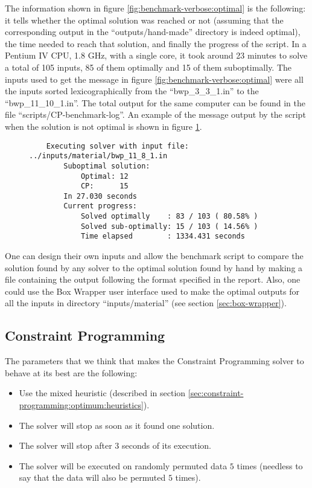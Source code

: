 The information shown in figure \ref{fig:benchmark-verbose:optimal} is the following:
it tells whether the optimal solution was reached or not (assuming that the
corresponding output in the ``outputs/hand-made'' directory is indeed optimal),
the time needed to reach that solution, and finally the progress of the script.
In a Pentium IV CPU, 1.8 GHz, with a single core, it took around 23 minutes to
solve a total of 105 inputs, 85 of them optimally and 15 of them suboptimally.
The inputs used to get the message in figure \ref{fig:benchmark-verbose:optimal} were
all the inputs sorted lexicographically from the ``bwp\_3\_3\_1.in'' to the
``bwp\_11\_10\_1.in''. The total output for the same computer can be found
in the file ``scripts/CP-benchmark-log''. An example of the message output by
the script when the solution is not optimal is shown in figure
\ref{fig:benchmark-verbose:suboptimal}.

\begin{figure}[H]
\centering
\begin{verbatim}
	Executing solver with input file: ../inputs/material/bwp_11_8_1.in
		Suboptimal solution:
			Optimal: 12
			CP:      15
		In 27.030 seconds
		Current progress:
			Solved optimally    : 83 / 103 ( 80.58% )
			Solved sub-optimally: 15 / 103 ( 14.56% )
			Time elapsed        : 1334.431 seconds
\end{verbatim}
\label{fig:benchmark-verbose:suboptimal}
\end{figure}

\hfill

One can design their own inputs and allow the benchmark script to compare
the solution found by any solver to the optimal solution found by hand by
making a file containing the output following the format specified in the
report. Also, one could use the Box Wrapper user interface used to make the
optimal outputs for all the inputs in directory ``inputs/material'' (see
section \ref{sec:box-wrapper}).

\subsection{Constraint Programming}
\label{sec:benchmarking:constraint-programming}

The parameters that we think that makes the Constraint Programming solver to behave
at its best are the following:
\begin{itemize}
	\item Use the mixed heuristic (described in section \ref{sec:constraint-programming:optimum:heuristics}).
	\item The solver will stop as soon as it found one solution.
	\item The solver will stop after 3 seconds of its execution.
	\item The solver will be executed on randomly permuted data $5$ times (needless to
	say that the data will also be permuted $5$ times).
\end{itemize}